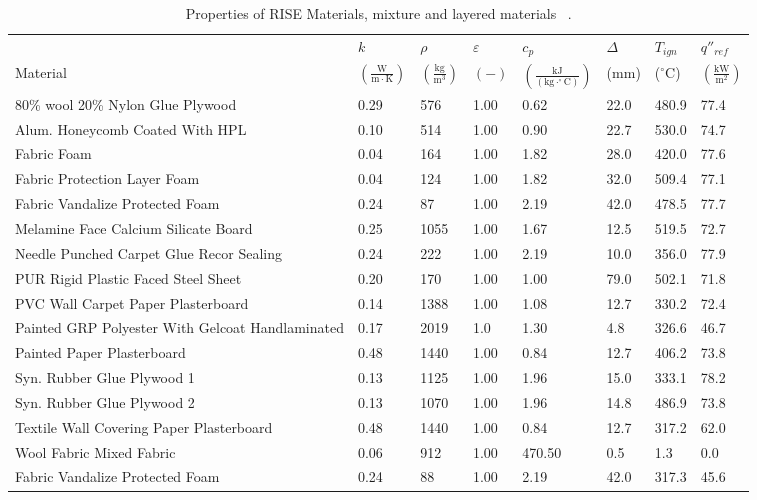 \begin{table}[!h]
\caption[Properties of RISE Materials, mixture and layered materials]{Properties of RISE Materials, mixture and layered materials ~\cite{RISE:Fire_Database}.}
\centering
\begin{tabular}{|p{2.6cm}|p{1.8cm}|p{1.3cm}|p{0.9cm}|p{1.7cm}|p{1.0cm}|p{1.0cm}|p{1.6cm}|}
\hline
                                               & $k$    & $\rho$      & $\varepsilon$   & $c_{p}$ & $\Delta$    & $T_{ign}$ & $q''_{ref}$ \\
Material                                       & $\mathrm{\left(\frac{W}{m\cdot K}\right)}$ & $\mathrm{\left(\frac{kg}{m^{3}}\right)}$ & $\mathrm{( - )}$ & $\mathrm{\left(\frac{kJ}{(kg\cdot ^{\circ}C)}\right)}$ &  ($\mathrm{mm}$)   & ($\mathrm{^{\circ}C}$) & $\mathrm{\left(\frac{kW}{m^{2}}\right)}$ \\ \hline
\hline
80\% wool 20\% Nylon Glue Plywood & 0.29 & 576 & 1.00 & 0.62 & 22.0 & 480.9 & 77.4 \\ \hline 
Alum. Honeycomb Coated With HPL & 0.10 & 514 & 1.00 & 0.90 & 22.7 & 530.0 & 74.7 \\ \hline 
Fabric Foam & 0.04 & 164 & 1.00 & 1.82 & 28.0 & 420.0 & 77.6 \\ \hline 
Fabric Protection Layer Foam & 0.04 & 124 & 1.00 & 1.82 & 32.0 & 509.4 & 77.1 \\ \hline 
Fabric Vandalize Protected Foam & 0.24 & 87 & 1.00 & 2.19 & 42.0 & 478.5 & 77.7 \\ \hline 
Melamine Face Calcium Silicate Board & 0.25 & 1055 & 1.00 & 1.67 & 12.5 & 519.5 & 72.7 \\ \hline 
Needle Punched Carpet Glue Recor Sealing & 0.24 & 222 & 1.00 & 2.19 & 10.0 & 356.0 & 77.9 \\ \hline 
PUR Rigid Plastic Faced Steel Sheet & 0.20 & 170 & 1.00 & 1.00 & 79.0 & 502.1 & 71.8 \\ \hline 
PVC Wall Carpet Paper Plasterboard & 0.14 & 1388 & 1.00 & 1.08 & 12.7 & 330.2 & 72.4 \\ \hline 
Painted GRP Polyester With Gelcoat Handlaminated & 0.17 & 2019 & 1.0 & 1.30 & 4.8 & 326.6 & 46.7 \\ \hline 
Painted Paper Plasterboard & 0.48 & 1440 & 1.00 & 0.84 & 12.7 & 406.2 & 73.8 \\ \hline 
Syn. Rubber Glue Plywood 1 & 0.13 & 1125 & 1.00 & 1.96 & 15.0 & 333.1 & 78.2 \\ \hline 
Syn. Rubber Glue Plywood 2 & 0.13 & 1070 & 1.00 & 1.96 & 14.8 & 486.9 & 73.8 \\ \hline 
Textile Wall Covering Paper Plasterboard & 0.48 & 1440 & 1.00 & 0.84 & 12.7 & 317.2 & 62.0 \\ \hline 
Wool Fabric Mixed Fabric & 0.06 & 912 & 1.00 & 470.50 & 0.5 & 1.3 & 0.0 \\ \hline 
Fabric Vandalize Protected Foam & 0.24 & 88 & 1.00 & 2.19 & 42.0 & 317.3 & 45.6 \\ \hline 
\end{tabular}
\label{Properties_RISE_Materials_mixtures}
\end{table}

